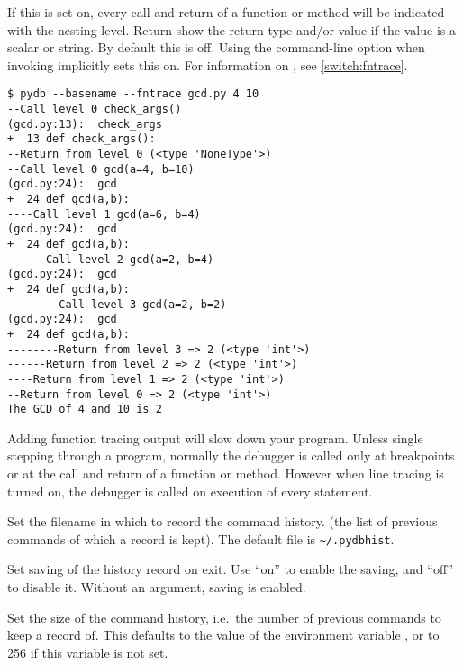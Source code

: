 \begin{description}
If this is set on, every call and return of a function or method will
be indicated with the nesting level. Return show the return type
and/or value if the value is a scalar or string.  By default this is
off. Using the command-line option  when invoking
 implicitly sets this on.  For information on
, see \ref{switch:fntrace}.

\begin{verbatim}
$ pydb --basename --fntrace gcd.py 4 10
--Call level 0 check_args()
(gcd.py:13):  check_args
+  13 def check_args():
--Return from level 0 (<type 'NoneType'>)
--Call level 0 gcd(a=4, b=10)
(gcd.py:24):  gcd
+  24 def gcd(a,b):
----Call level 1 gcd(a=6, b=4)
(gcd.py:24):  gcd
+  24 def gcd(a,b):
------Call level 2 gcd(a=2, b=4)
(gcd.py:24):  gcd
+  24 def gcd(a,b):
--------Call level 3 gcd(a=2, b=2)
(gcd.py:24):  gcd
+  24 def gcd(a,b):
--------Return from level 3 => 2 (<type 'int'>)
------Return from level 2 => 2 (<type 'int'>)
----Return from level 1 => 2 (<type 'int'>)
--Return from level 0 => 2 (<type 'int'>)
The GCD of 4 and 10 is 2
\end{verbatim}

Adding function tracing output will slow down your
program. Unless single stepping through a program, normally the
debugger is called only at breakpoints or at the call and return of a
function or method. However when line tracing is turned on, the
debugger is called on execution of every statement. 

\item[set history filename \var{filename}]\label{command:hist-filename}

Set the filename in which to record the command history.
(the list of previous commands of which a record is kept). The default
file is \verb|~/.pydbhist|.

\item[set history save on\code{\Large{|}}off]

Set saving of the history record on exit.  Use ``on'' to enable the
saving, and ``off'' to disable it.  Without an argument, saving is
enabled.

\item[set history size \var{number}]

Set the size of the command history, i.e.\ the number of previous
commands to keep a record of. This defaults to the value of the environment variable
, or to 256 if this variable is not set.

\item[set linetrace on\code{\Large{|}}off]\label{command:linetrace}


\end{description}
